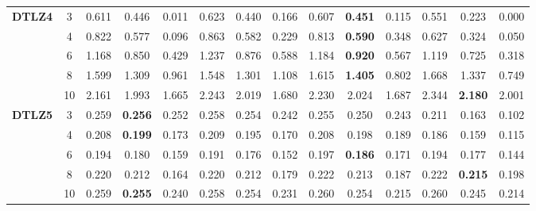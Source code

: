 \documentclass[onecolumn,10pt]{asme2ej}
\begin{document}
\begin{table}[!htb]
\begin{tabular}{|c|c|c|c|c|c|c|c|c|c|c|c|c|c|}
	\multirow{5}{*}{\textbf{DTLZ4}} & 3          & 0.611         & 0.446          & 0.011          & 0.623         & 0.440          & 0.166          & 0.607         & \textbf{0.451} & 0.115          & 0.551         & 0.223          & 0.000          \\ \cline{2-14} 
	& 4          & 0.822         & 0.577          & 0.096          & 0.863         & 0.582          & 0.229          & 0.813         & \textbf{0.590} & 0.348          & 0.627         & 0.324          & 0.050          \\ \cline{2-14} 
	& 6          & 1.168         & 0.850          & 0.429          & 1.237         & 0.876          & 0.588          & 1.184         & \textbf{0.920} & 0.567          & 1.119         & 0.725          & 0.318          \\ \cline{2-14} 
	& 8          & 1.599         & 1.309          & 0.961          & 1.548         & 1.301          & 1.108          & 1.615         & \textbf{1.405} & 0.802          & 1.668         & 1.337          & 0.749          \\ \cline{2-14} 
	& 10         & 2.161         & 1.993          & 1.665          & 2.243         & 2.019          & 1.680          & 2.230         & 2.024          & 1.687          & 2.344         & \textbf{2.180} & 2.001          \\ \hline
	\multirow{5}{*}{\textbf{DTLZ5}} & 3          & 0.259         & \textbf{0.256} & 0.252          & 0.258         & 0.254          & 0.242          & 0.255         & 0.250          & 0.243          & 0.211         & 0.163          & 0.102          \\ \cline{2-14} 
	& 4          & 0.208         & \textbf{0.199} & 0.173          & 0.209         & 0.195          & 0.170          & 0.208         & 0.198          & 0.189          & 0.186         & 0.159          & 0.115          \\ \cline{2-14} 
	& 6          & 0.194         & 0.180          & 0.159          & 0.191         & 0.176          & 0.152          & 0.197         & \textbf{0.186} & 0.171          & 0.194         & 0.177          & 0.144          \\ \cline{2-14} 
	& 8          & 0.220         & 0.212          & 0.164          & 0.220         & 0.212          & 0.179          & 0.222         & 0.213          & 0.187          & 0.222         & \textbf{0.215} & 0.198          \\ \cline{2-14} 
	& 10         & 0.259         & \textbf{0.255} & 0.240          & 0.258         & 0.254          & 0.231          & 0.260         & 0.254          & 0.215          & 0.260         & 0.245          & 0.214          \\ \hline

\end{tabular}
\end{table}
\end{document}
